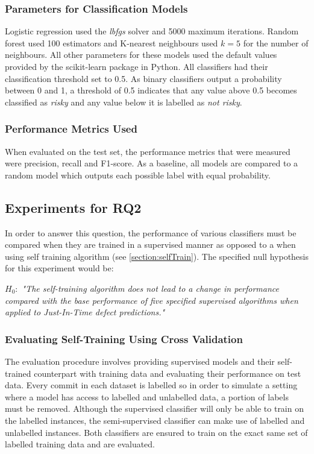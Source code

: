 \documentclass[../main.tex]{subfiles}
\begin{document}
\subsubsection{Parameters for Classification Models}

Logistic regression used the \textit{lbfgs} solver and 5000 maximum iterations. Random forest used 100 estimators and K-nearest neighbours used $k=5$ for the number of neighbours. All other parameters for these models used the default values provided by the scikit-learn package in Python. All classifiers had their classification threshold set to 0.5. As binary classifiers output a probability between 0 and 1, a threshold of 0.5 indicates that any value above 0.5 becomes classified as \textit{risky} and any value below it is labelled as \textit{not risky}. 

\subsubsection{Performance Metrics Used}

When evaluated on the test set, the performance metrics that were measured were precision, recall and F1-score. As a baseline, all models are compared to a random model which outputs each possible label with equal probability. 

\subsection{Experiments for RQ2}

In order to answer this question, the performance of various classifiers must be compared when they are trained in a supervised manner as opposed to a when using self training algorithm (see \ref{section:selfTrain}). The specified null hypothesis for this experiment would be:

\begin{center}
   \textit{$H_0:$ "The self-training algorithm does not lead to a change in performance compared with the base performance of five specified supervised algorithms when applied to Just-In-Time defect predictions."}
\end{center}


\subsubsection{Evaluating Self-Training Using Cross Validation}

The evaluation procedure involves providing supervised models and their self-trained counterpart with training data and evaluating their performance on test data. Every commit in each dataset is labelled so in order to simulate a setting where a model has access to labelled and unlabelled data, a portion of labels must be removed. Although the supervised classifier will only be able to train on the labelled instances, the semi-supervised classifier can make use of labelled and unlabelled instances. Both classifiers are ensured to train on the exact same set of labelled training data and are evaluated.
\end{document}
